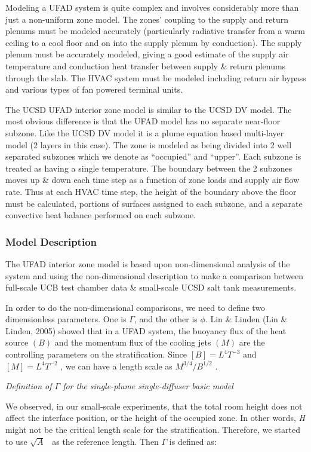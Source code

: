 Modeling a UFAD system is quite complex and involves considerably more than just a non-uniform zone model. The zones' coupling to the supply and return plenums must be modeled accurately (particularly radiative transfer from a warm ceiling to a cool floor and on into the supply plenum by conduction). The supply plenum must be accurately modeled, giving a good estimate of the supply air temperature and conduction heat transfer between supply \& return plenums through the slab. The HVAC system must be modeled including return air bypass and various types of fan powered terminal units.

The UCSD UFAD interior zone model is similar to the UCSD DV model. The most obvious difference is that the UFAD model has no separate near-floor subzone. Like the UCSD DV model it is a plume equation based multi-layer model (2 layers in this case). The zone is modeled as being divided into 2 well separated subzones which we denote as ``occupied'' and ``upper''. Each subzone is treated as having a single temperature. The boundary between the 2 subzones moves up \& down each time step as a function of zone loads and supply air flow rate. Thus at each HVAC time step, the height of the boundary above the floor must be calculated, portions of surfaces assigned to each subzone, and a separate convective heat balance performed on each subzone.

\subsubsection{Model Description}\label{model-description-1-001}

The UFAD interior zone model is based upon non-dimensional analysis of the system and using the non-dimensional description to make a comparison between full-scale UCB test chamber data \& small-scale UCSD salt tank measurements.

In order to do the non-dimensional comparisons, we need to define two dimensionless parameters. One is \(\Gamma\), and the other is \(\phi\). Lin \& Linden (Lin \& Linden, 2005) showed that in a UFAD system, the buoyancy flux of the heat source \((B)\) and the momentum flux of the cooling jets \((M)\) are the controlling parameters on the stratification. Since \([B] = {L^4}{T^{ - 3}}\) and\([M] = {L^4}{T^{ - 2}}\) , we can have a length scale as \({M^{3/4}}/{B^{1/2}}\) .

\emph{Definition of \(\Gamma\) for the single-plume single-diffuser basic model}

We observed, in our small-scale experiments, that the total room height does not affect the interface position, or the height of the occupied zone. In other words, \emph{H} might not be the critical length scale for the stratification. Therefore, we started to use \(\sqrt A\) ~as the reference length. Then \(\Gamma\) is defined as:

